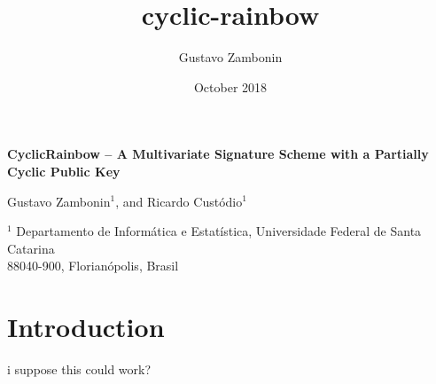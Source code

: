 \documentclass[a4paper,14pt]{extarticle}
\title{cyclic-rainbow}
\author{Gustavo Zambonin}
\date{October 2018}
\begin{document}
\begin{center}
    {\Large\bf CyclicRainbow -- A Multivariate Signature 
    Scheme with a Partially Cyclic Public Key} \vspace{1cm}
    
    Gustavo Zambonin$^{1}$, and Ricardo Custódio$^{1}$ \vspace{.5cm}
    
    $^{1}$ Departamento de Informática e Estatística, Universidade Federal de Santa Catarina \\
    88040-900, Florianópolis, Brasil
\end{center}

\section{Introduction}

i suppose this could work?
\end{document}
